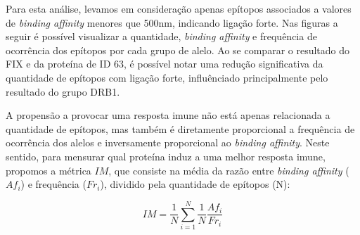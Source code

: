 Para esta análise, levamos em consideração apenas epítopos associados a valores de \textit{binding affinity} 
menores que 500nm, indicando ligação forte. 
Nas figuras a seguir é possível visualizar a quantidade, \textit{binding affinity} e frequência de ocorrência 
dos epítopos por cada grupo de alelo. Ao se comparar o resultado do FIX e da proteína de ID 63,
é possível notar uma redução significativa da quantidade de epítopos com ligação forte, influênciado principalmente 
pelo resultado do grupo DRB1. 

\begin{figure}%
    \centering
    \qquad
\end{figure}

A propensão a provocar uma resposta imune não está apenas relacionada a quantidade de epítopos, 
mas também é diretamente proporcional a frequência de ocorrência dos alelos e inversamente proporcional 
ao \textit{binding affinity}. Neste sentido, para mensurar qual proteína induz a uma melhor resposta imune, propomos a 
métrica $IM$, que consiste na média da razão entre \textit{binding affinity} (${Af}_{i}$) 
e frequência ($Fr_{i}$), 
dividido pela quantidade de epítopos (N):

\begin{equation}
    IM = \frac{1}{N} \sum_{i=1}^{N} \frac{1}{N} \frac{{Af}_{i}}{Fr_{i}}
\end{equation}

